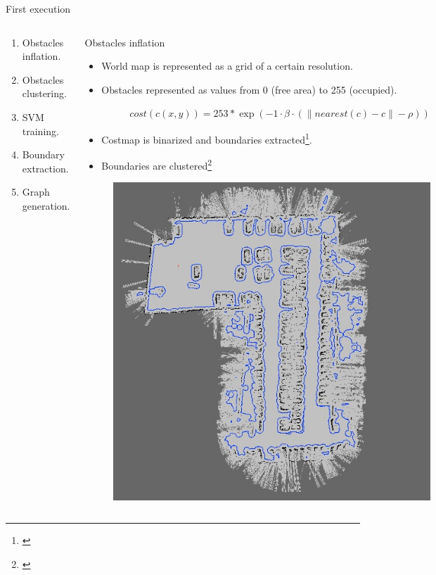 \begin{frame}{First execution}
  \begin{columns}
    \hskip -0.5cm
    \begin{overlayarea}{\textwidth}{\textheight}
      \begin{enumerate}
	\item<1-> Obstacles inflation.
	\item<1-> Obstacles clustering.
	\item<3-> SVM training.
	\item<4-> Boundary extraction.
	\item<5-> Graph generation.
      \end{enumerate}
    \end{overlayarea}
    \vskip -1cm
    \begin{overlayarea}{\textwidth}{\textheight}
       {
	\begin{block}{Obstacles inflation}
	  \begin{itemize}
	    \item World map is represented as a grid of a certain resolution.
	    \item Obstacles represented as values from 0 (free area) to 255 (occupied).
	    \begin{figure}
	      \scriptsize $cost(c(x,y)) = 253 * \exp( -1 \cdot \beta \cdot (\| nearest(c) - c\| - \rho) )$
	    \end{figure}
	    \item Costmap is binarized and boundaries extracted\footnote{\cite{suzuki1985topological}}.
	    \item Boundaries are clustered\footnote{\cite{rusu2009semantic}}
	  \end{itemize}
	\end{block}
      }
       {
	\vskip 0.25cm
	\begin{figure}	
	  \includegraphics{figure1}

\end{figure}}
\end{overlayarea}
\end{columns}
\end{frame}
